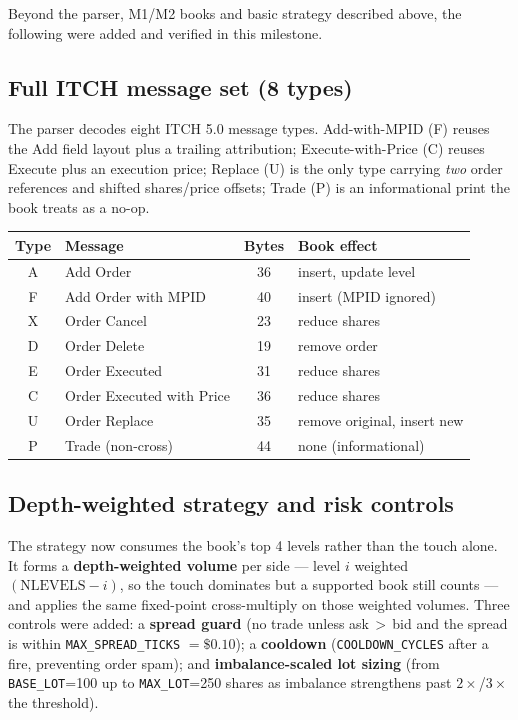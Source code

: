\documentclass[11pt,a4paper]{article}
\begin{document}
Beyond the parser, M1/M2 books and basic strategy described above, the following
were added and verified in this milestone.

\subsection{Full ITCH message set (8 types)}

The parser decodes eight ITCH 5.0 message types. Add-with-MPID (F) reuses the
Add field layout plus a trailing attribution; Execute-with-Price (C) reuses
Execute plus an execution price; Replace (U) is the only type carrying \emph{two}
order references and shifted shares/price offsets; Trade (P) is an informational
print the book treats as a no-op.

\begin{center}
\small
\begin{tabular}{c l c l}
\toprule
\textbf{Type} & \textbf{Message} & \textbf{Bytes} & \textbf{Book effect} \\
\midrule
A & Add Order                 & 36 & insert, update level \\
F & Add Order with MPID       & 40 & insert (MPID ignored) \\
X & Order Cancel              & 23 & reduce shares \\
D & Order Delete              & 19 & remove order \\
E & Order Executed            & 31 & reduce shares \\
C & Order Executed with Price & 36 & reduce shares \\
U & Order Replace             & 35 & remove original, insert new \\
P & Trade (non-cross)         & 44 & none (informational) \\
\bottomrule
\end{tabular}
\end{center}

\subsection{Depth-weighted strategy and risk controls}

The strategy now consumes the book's top 4 levels rather than the touch alone.
It forms a \textbf{depth-weighted volume} per side --- level $i$ weighted
$(\text{NLEVELS}-i)$, so the touch dominates but a supported book still counts ---
and applies the same fixed-point cross-multiply on those weighted volumes. Three
controls were added: a \textbf{spread guard} (no trade unless ask\,$>$\,bid and
the spread is within \texttt{MAX\_SPREAD\_TICKS} $=\$0.10$); a \textbf{cooldown}
(\texttt{COOLDOWN\_CYCLES} after a fire, preventing order spam); and
\textbf{imbalance-scaled lot sizing} (from \texttt{BASE\_LOT}=100 up to
\texttt{MAX\_LOT}=250 shares as imbalance strengthens past $2\times$/$3\times$ the
threshold).
\end{document}
